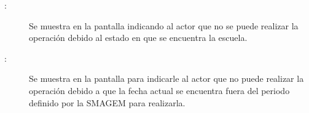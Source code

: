     \begin{description}
	\item[:] Se muestra en la pantalla  indicando al actor que no se puede realizar la operación debido al estado en que se encuentra la escuela.
	
	\item [:] Se muestra en la pantalla  para indicarle al actor que no puede realizar la operación debido a que la fecha actual se encuentra fuera del periodo definido por la SMAGEM para realizarla.
    \end{description}
